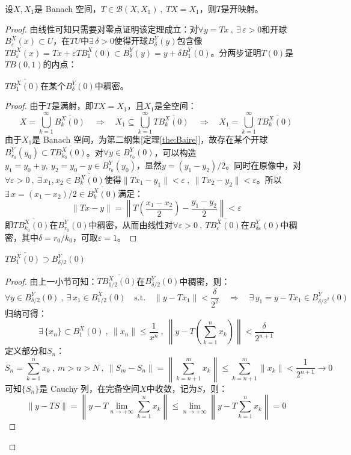 \begin{theorem}[开映射定理]\label{theorem:kys}
设$X,X_1$是 Banach 空间，$T \in \mathscr{B}(X,X_1) \ , \ TX=X_1$，则$T$是开映射。
\end{theorem} 
\begin{proof}
由线性可知只需要对零点证明该定理成立：对$\forall y=Tx \ , \ \exists \, \varepsilon>0$和开球$B_{\varepsilon}^X(x) \subset U$，在$TU$中$\exists \, \delta>0$使得开球$B_{\delta}^Y(y)$包含像$TB_{\varepsilon}^X(x)=Tx+\varepsilon TB_1^X(0) \subset B_{\delta}^Y(y)=y+\delta B_1^Y(0)$。分两步证明$T(0)$是$TB(0,1)$的内点：
\begin{proposition}
$T\overline{B^X_1(0)}$在某个$B^Y_{\delta}(0)$中稠密。
\end{proposition}
\begin{proof}
由于$T$是满射，即$TX=X_1$，且$X_1$是全空间：
\[X=\bigcup_{k=1}^{\infty}\overline{B^X_k(0)} \quad \Rightarrow \quad X_1 \subseteq \bigcup_{k=1}^{\infty}T\overline{B^X_k(0)} \quad \Rightarrow \quad X_1=\bigcup_{k=1}^{\infty}T\overline{B^X_k(0)}\]
由于$X_1$是 Banach 空间，为第二纲集[定理\ref{the:Baire}]，故存在某个开球$B_{r_0}^Y(y_0) \subset T\overline{B_{k_0}^X(0)}$。对$\forall y \in B_{r_0}^Y(0)$，可以构造$y_1=y_0+y, \ y_2=y_0-y \in B_{r_0}^Y(y_0)$，显然$y=(y_1-y_2)/2$。同时在原像中，对$\forall \varepsilon>0 \ , \ \exists \, x_1,x_2 \in \overline{B^X_k(0)}$使得$\|Tx_1-y_1\|<\varepsilon \ , \ \|Tx_2-y_2\|<\varepsilon$。所以$\exists \, x=(x_1-x_2)/2 \in \overline{B^X_k(0)}$满足：
\[\|Tx-y\|=\left\|T\left(\frac{x_1-x_2}{2}\right)-\frac{y_1-y_2}{2}\right\|<\varepsilon\]
即$T\overline{B_{k_0}^X(0)}$在$B_{r_0}^Y(0)$中稠密，从而由线性对$\forall \varepsilon>0 \ , \ T\overline{B^X_{\varepsilon}(0)}$在$B_{\delta\varepsilon}^Y(0)$中稠密，其中$\delta=r_0/k_0$，可取$\varepsilon=1$。
\end{proof}
\begin{proposition}\label{proposition:Step2}
$T\overline{B_1^X(0)} \supset B_{\delta/2}^Y(0)$
\end{proposition}
\begin{proof}
由上一小节可知：$T\overline{B^X_{1/2}(0)}$在$B^Y_{\delta/2}(0)$中稠密，则：
\[\forall y \in B^Y_{\delta/2}(0) \ , \ \exists \, x_1 \in B^X_{1/2}(0) \quad \text{s.t.} \quad \|y-Tx_1\|<\frac{\delta}{2^2} \quad \Rightarrow \quad \exists \, y_1=y-Tx_1 \in B^Y_{\delta/2^2}(0)\]
归纳可得：
\[\exists \, \{x_n\} \subset B_1^X(0) \ , \ \|x_n\| \leq \frac{1}{x^n} \ , \ \left\|y-T\left(\sum_{k=1}^nx_k\right)\right\|<\frac{\delta}{2^{n+1}}\]
定义部分和$S_n$：
\[S_n=\sum_{k=1}^nx_k \ , \ m>n>N \ , \ \|S_m-S_n\|=\left\|\sum_{k=n+1}^mx_k\right\| \leq \sum_{k=n+1}^m\|x_k\|<\frac{1}{2^{n+1}} \to 0\]
可知$\{S_n\}$是 Cauchy 列，在完备空间$X$中收敛，记为$S$，则：
\[\|y-TS\|=\left\|y-T\lim_{n \to +\infty}\sum_{k=1}^nx_k\right\| \leq \lim_{n \to +\infty}\left\|y-T\sum_{k=1}^nx_k\right\|=0\]


\end{proof}
\end{proof}
